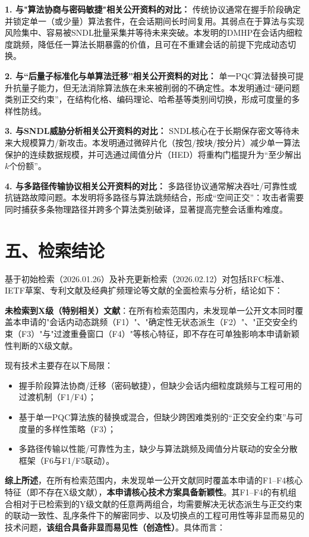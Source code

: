 \documentclass[12pt,a4paper]{article}
\begin{document}
        \textbf{1. 与"算法协商与密码敏捷"相关公开资料的对比：}
传统协议通常在握手阶段确定并锁定单一（或少量）算法套件，在会话期间长时间复用。其弱点在于算法与实现风险集中、容易被SNDL批量采集并等待未来突破。本发明的DMHP在会话内细粒度跳频，降低任一算法长期暴露的价值，且可在不重建会话的前提下完成动态切换。

        \textbf{2. 与“后量子标准化与单算法迁移”相关公开资料的对比：}
单一PQC算法替换可提升抗量子能力，但无法消除算法族在未来被削弱的不确定性。本发明通过“硬问题类别正交约束”，在结构化格、编码理论、哈希基等类别间切换，形成可度量的多样性防线。

        \textbf{3. 与SNDL威胁分析相关公开资料的对比：}
SNDL核心在于长期保存密文等待未来大规模算力/新攻击。本发明通过微碎片化（按包/按块/按分片）减少单一算法保护的连续数据规模，并可选通过阈值分片（HED）将重构门槛提升为“至少解出$k$个份额”。

        \textbf{4. 与多路径传输协议相关公开资料的对比：}
多路径协议通常解决吞吐/可靠性或抗链路故障问题。本发明将多路径与算法跳频结合，形成“空间正交”：攻击者需要同时捕获多条物理路径并跨多个算法类别破译，显著提高完整会话重构难度。

\section*{五、检索结论}

基于初始检索（2026.01.26）及补充更新检索（2026.02.12）对包括RFC标准、IETF草案、专利文献及经典扩频理论等文献的全面检索与分析，结论如下：

\textbf{未检索到X级（特别相关）文献}：在所有检索范围内，未发现单一公开文本同时覆盖本申请的"会话内动态跳频（F1）"、"确定性无状态派生（F2）"、"正交安全约束（F3）"与"过渡重叠窗口（F4）"等核心特征，即不存在可单独影响本申请新颖性判断的X级文献。

现有技术主要存在以下局限：

\begin{itemize}[leftmargin=2em]
    \item 握手阶段算法协商/迁移（密码敏捷），但缺少会话内细粒度跳频与工程可用的过渡机制（F1/F4）；
    \item 基于单一PQC算法族的替换或混合，但缺少跨困难类别的“正交安全约束”与可度量的多样性策略（F3）；
    \item 多路径传输以性能/可靠性为主，缺少与算法跳频及阈值分片联动的安全分散框架（F6与F1/F5联动）。
\end{itemize}

\textbf{综上所述}，在所有检索范围内，未发现单一公开文献同时覆盖本申请的F1--F4核心特征（即不存在X级文献），\textbf{本申请核心技术方案具备新颖性}。其F1--F4的有机组合相对于已检索到的Y级文献的任意两两组合，均需要解决无状态派生与正交约束的联动一致性、乱序条件下的解密同步、以及切换点的工程可用性等非显而易见的技术问题，\textbf{该组合具备非显而易见性（创造性）}。具体而言：
\end{document}
